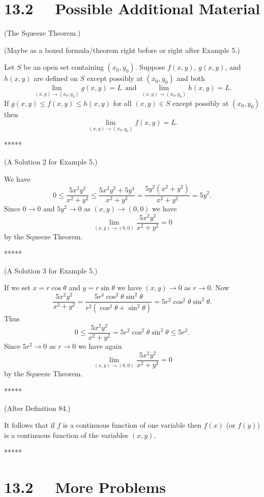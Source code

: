 \section*{13.2 \ \  Possible Additional Material}


(The Squeeze Theorem.)

(Maybe as a boxed formula/theorem right before or right after Example 5.)

Let $S$ be an open set containing $(x_0, y_0)$.  Suppose $f(x, y)$, $g(x, y)$, and $h(x, y)$ are defined on $S$ except possibly at $(x_0, y_0)$ and both
\[
\lim_{(x,y) \rightarrow (x_0, y_0)} g(x, y) = L \ \ \text{and} \ \ \lim_{(x,y) \rightarrow (x_0, y_0)} h(x, y) = L.
\]
If $g(x, y) \leq f(x, y) \leq h(x, y)$ for all $(x, y) \in S$ except possibly at $(x_0, y_0)$ then
\[
\lim_{(x,y) \rightarrow (x_0, y_0)} f(x, y) = L.
\]

*****

(A Solution 2 for Example 5.)

We have 
\[
0 \leq \frac{5x^2y^2}{x^2 + y^2} \leq \frac{5x^2y^2 + 5y^4}{x^2 + y^2}
= \frac{5y^2(x^2+y^2)}{x^2 + y^2} = 5y^2.
\]
Since $0 \rightarrow 0$ and $5y^2 \rightarrow 0$ as $(x, y) \rightarrow (0,0)$ we have 
\[
\lim_{(x,y) \rightarrow (0, 0)} \frac{5x^2y^2}{x^2 + y^2} = 0
\]
by the Squeeze Theorem.

*****

(A Solution 3 for Example 5.)

If we set $x = r \cos \theta$ and $y = r \sin \theta$ we have $(x, y) \rightarrow 0$ as $r \rightarrow 0$.  Now
\[
\frac{5x^2y^2}{x^2 + y^2} = \frac{5r^4 \cos^2 \theta \sin^2 \theta}{r^2(\cos^2 \theta + \sin^2 \theta)} = 5r^2 \cos^2 \theta \sin^2 \theta.
\]
Thus 
\[
0 \leq \frac{5x^2y^2}{x^2 + y^2} = 5r^2 \cos^2 \theta \sin^2 \theta \leq 5r^2.
\]
Since $5r^2 \rightarrow 0$ as $r \rightarrow 0$ we have again
\[
\lim_{(x,y) \rightarrow (0, 0)} \frac{5x^2y^2}{x^2 + y^2} = 0
\]
by the Squeeze Theorem.

*****

(After Definition 84.)

It follows that if $f$ is a continuous function of one variable then $f(x)$ (or $f(y)$) is a continuous function of the variables $(x, y)$.

*****

\section*{13.2 \ \ More Problems}

